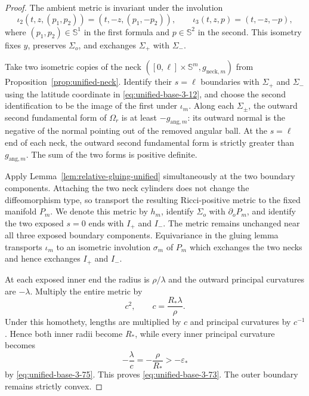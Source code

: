 \documentclass[11pt,reqno]{amsart}
\theoremstyle{definition}
\numberwithin{equation}{section}
\begin{document}
\begin{proof}
The ambient metric is invariant under the involution
\begin{equation}
\iota_2(t,z,(p_1,p_2))=(t,-z,(p_1,-p_2)),\qquad
 \iota_3(t,z,p)=(t,-z,-p),                                      \label{eq:unified-base-3-79}
\end{equation}
where $(p_1,p_2)\in\mathbb S^1$ in the first formula and
$p\in\mathbb S^2$ in the second.  This isometry fixes $y$, preserves
$\Sigma_o$, and exchanges $\Sigma_+$ with $\Sigma_-$.

Take two isometric copies of the neck
$([0,\ell]\times\mathbb S^m,g_{\mathrm{neck},m})$ from
Proposition~\ref{prop:unified-neck}.  Identify their $s=\ell$
boundaries with $\Sigma_+$ and $\Sigma_-$ using the latitude coordinate
in \eqref{eq:unified-base-3-12}, and choose the second identification to
be the image of the first under $\iota_m$.  Along each $\Sigma_\pm$, the
outward second fundamental form of $\Omega_r$ is at least
$-g_{\mathrm{ang},m}$: its outward normal is the negative of the normal
pointing out of the removed angular ball.  At the $s=\ell$ end of each
neck, the outward second fundamental form is strictly greater than
$g_{\mathrm{ang},m}$.  The sum of the two forms is positive definite.

Apply Lemma~\ref{lem:relative-gluing-unified} simultaneously at the two
boundary components.  Attaching the two neck cylinders does not change
the diffeomorphism type, so transport the resulting
Ricci-positive metric to the fixed manifold $P_m$.  We denote this
metric by $h_m$, identify $\Sigma_o$ with $\partial_oP_m$, and identify
the two exposed $s=0$ ends with $I_+$ and $I_-$.  The metric remains
unchanged near all three exposed boundary components.  Equivariance in
the gluing lemma transports $\iota_m$ to an isometric involution
$\sigma_m$ of $P_m$ which exchanges the two necks and hence exchanges
$I_+$ and $I_-$.

At each exposed inner end the radius is $\rho/\lambda$ and the outward
principal curvatures are $-\lambda$.  Multiply the entire metric by
\begin{equation}
c^2,\qquad
                         c=\frac{R_*\lambda}{\rho}.                \label{eq:unified-base-3-80}
\end{equation}
Under this homothety, lengths are multiplied by $c$ and principal
curvatures by $c^{-1}$.  Hence both inner radii become $R_*$, while
every inner principal curvature becomes
\[
 -\frac{\lambda}{c}=-\frac{\rho}{R_*}>-\varepsilon_*
\]
by \eqref{eq:unified-base-3-75}.  This proves
\eqref{eq:unified-base-3-73}.  The outer boundary remains strictly
convex.


\end{proof}
\end{document}
